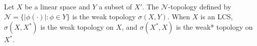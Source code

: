 Let $X$ be a linear space and $Y$ a subset of $X'$. The $\mathcal{N}$-topology defined by $\mathcal{N} = \{|\phi(\cdot)| : \phi \in Y\}$ is the weak topology $\sigma(X, Y)$. When $X$ is an LCS, $\sigma(X, X^*)$ is the weak topology on $X$, and $\sigma(X^*, X)$ is the weak* topology on $X^*$.